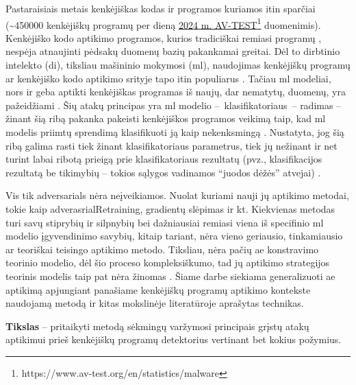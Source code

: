 
Pastaraisiais metais kenkėjiškas kodas ir programos kuriamos itin sparčiai (\sim450000 kenkėjiškų programų per dieną \href{https://www.av-test.org/en/statistics/malware/}{2024 m. AV-TEST}\footnote{https://www.av-test.org/en/statistics/malware} duomenimis). Kenkėjiško kodo aptikimo programos, kurios tradiciškai remiasi programų , nespėja atnaujinti pėdsakų duomenų bazių pakankamai greitai. Dėl to dirbtinio intelekto (\gls{di}), tiksliau mašininio mokymosi (\gls{ml}), naudojimas kenkėjiškų programų ar kenkėjiško kodo aptikimo srityje tapo itin populiarus \cite{demetrioAdversarialEXEmplesSurvey2021}. Tačiau \gls{ml} modeliai, nors ir geba aptikti kenkėjiškas programas iš naujų, dar nematytų, duomenų, yra pažeidžiami  \cite{castroAIMEDEvolvingMalware2019,huGeneratingAdversarialMalware2017,rosenbergGenericBlackBoxEndEnd2018,zhongReinforcementLearningBased2022}. Šių atakų principas yra \gls{ml} modelio --~klasifikatoriaus~--  radimas -- žinant šią ribą pakanka pakeisti kenkėjiškos programos veikimą taip, kad \gls{ml} modelis priimtų sprendimą klasifikuoti ją kaip nekenksmingą \cite{demetrioAdversarialEXEmplesSurvey2021}. Nustatyta, jog šią ribą galima rasti tiek žinant klasifikatoriaus parametrus, tiek jų nežinant ir net turint labai ribotą prieigą prie klasifikatoriaus rezultatų (pvz., klasifikacijos rezultatą be tikimybių -- tokios sąlygos vadinamos \enquote{juodos dėžės} atvejai) \cite{fangEvadingMalwareEngines2019}.

Vis tik \glspl{adversarial} nėra neįveikiamos. Nuolat kuriami nauji jų aptikimo metodai, tokie kaip \gls{adverasrialRetraining}, gradientų slėpimas ir kt. Kiekvienas metodas turi savų stiprybių ir silpnybių bei dažniausiai remiasi viena iš specifinio \gls{ml} modelio įgyvendinimo savybių, kitaip tariant, nėra vieno geriausio, tinkamiausio ar teoriškai teisingo  aptikimo metodo. 
Tiksliau, nėra pačių \gls{ae} konstravimo teorinio modelio, dėl šio proceso kompleksiškumo, tad jų aptikimo strategijos teorinis modelis taip pat nėra žinomas \cite{chakrabortySurveyAdversarialAttacks2021}. Šiame darbe siekiama generalizuoti \gls{ae} aptikimą apjungiant panašiame kenkėjiškų programų aptikimo kontekste naudojamą \LIME \cite{ribeiroWhyShouldTrust2016} metodą ir kitas mokslinėje literatūroje aprašytas technikas.

\vspace{10pt}
\textbf{Tikslas} -- pritaikyti \LIME metodą sėkmingų varžymosi principais grįstų atakų aptikimui prieš kenkėjiškų programų detektorius vertinant bet kokius požymius.

